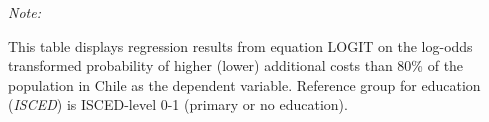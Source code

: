 \begin{table}[htbp!]
\begin{adjustbox}{width = 1\textwidth, max height = 0.95\textheight, center}
\begin{threeparttable}[b]
         \begin{tablenotes}\item \medskip \textit{Note:}
            \item This table displays regression results from equation LOGIT on the log-odds transformed probability of higher (lower) additional costs than 80\% of the population in Chile as the dependent variable. Reference group for education (\textit{ISCED}) is ISCED-level 0-1 (primary or no education).
         \end{tablenotes}
      \end{threeparttable}
   \end{adjustbox}
\end{table}


